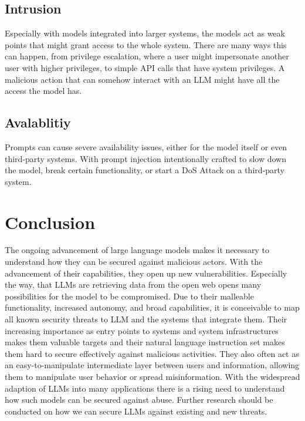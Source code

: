 \documentclass{SeminarV2}
\begin{document}
\subsection{Intrusion}
Especially with models integrated into larger systems, the models act as weak points that might grant access to the whole system. There are many ways this can happen, from privilege escalation, where a user might impersonate another user with higher privileges, to simple API calls that have system privileges. A malicious action that can somehow interact with an LLM might have all the access the model has.

\subsection{Avalablitiy}
Prompts can cause severe availability issues, either for the model itself or even third-party systems. With prompt injection intentionally crafted to slow down the model, break certain functionality, or start a DoS Attack on a third-party system. 

\section{Conclusion}

The ongoing advancement of large language models makes it necessary to understand how they can be secured against malicious actors. With the advancement of their capabilities, they open up new vulnerabilities. Especially the way, that LLMs are retrieving data from the open web opens many possibilities for the model to be compromised. Due to their malleable functionality, increased autonomy, and broad capabilities, it is conceivable to map all known security threats to LLM and the systems that integrate them. Their increasing importance as entry points to systems and system infrastructures makes them valuable targets and their natural language instruction set makes them hard to secure effectively against malicious activities. They also often act as an easy-to-manipulate intermediate layer between users and information, allowing them to manipulate user behavior or spread misinformation. With the widespread adaption of LLMs into many applications there is a rising need to understand how such models can be secured against abuse. Further research should be conducted on how we can secure LLMs against existing and new threats.



\begin{footnotesize}


  
  
  
  
\end{footnotesize}

\end{document}
